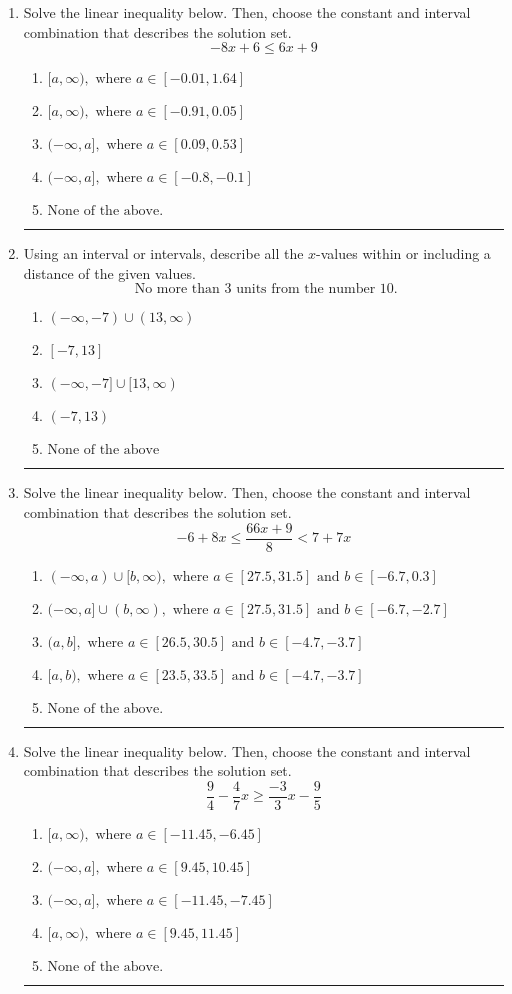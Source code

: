 \documentclass[14pt]{extbook}
\newcommand{\litem}[1]{\item#1\hspace*{-1cm}\rule{\textwidth}{0.4pt}}
\begin{document}
\begin{enumerate}
\litem{
Solve the linear inequality below. Then, choose the constant and interval combination that describes the solution set.\[ -8x + 6 \leq 6x + 9 \]\begin{enumerate}[label=\Alph*.]
\item \( [a, \infty), \text{ where } a \in [-0.01, 1.64] \)
\item \( [a, \infty), \text{ where } a \in [-0.91, 0.05] \)
\item \( (-\infty, a], \text{ where } a \in [0.09, 0.53] \)
\item \( (-\infty, a], \text{ where } a \in [-0.8, -0.1] \)
\item \( \text{None of the above}. \)

\end{enumerate} }
\litem{
Using an interval or intervals, describe all the $x$-values within or including a distance of the given values.\[ \text{ No more than } 3 \text{ units from the number } 10. \]\begin{enumerate}[label=\Alph*.]
\item \( (-\infty, -7) \cup (13, \infty) \)
\item \( [-7, 13] \)
\item \( (-\infty, -7] \cup [13, \infty) \)
\item \( (-7, 13) \)
\item \( \text{None of the above} \)

\end{enumerate} }
\litem{
Solve the linear inequality below. Then, choose the constant and interval combination that describes the solution set.\[ -6 + 8 x \leq \frac{66 x + 9}{8} < 7 + 7 x \]\begin{enumerate}[label=\Alph*.]
\item \( (-\infty, a) \cup [b, \infty), \text{ where } a \in [27.5, 31.5] \text{ and } b \in [-6.7, 0.3] \)
\item \( (-\infty, a] \cup (b, \infty), \text{ where } a \in [27.5, 31.5] \text{ and } b \in [-6.7, -2.7] \)
\item \( (a, b], \text{ where } a \in [26.5, 30.5] \text{ and } b \in [-4.7, -3.7] \)
\item \( [a, b), \text{ where } a \in [23.5, 33.5] \text{ and } b \in [-4.7, -3.7] \)
\item \( \text{None of the above.} \)

\end{enumerate} }
\litem{
Solve the linear inequality below. Then, choose the constant and interval combination that describes the solution set.\[ \frac{9}{4} - \frac{4}{7} x \geq \frac{-3}{3} x - \frac{9}{5} \]\begin{enumerate}[label=\Alph*.]
\item \( [a, \infty), \text{ where } a \in [-11.45, -6.45] \)
\item \( (-\infty, a], \text{ where } a \in [9.45, 10.45] \)
\item \( (-\infty, a], \text{ where } a \in [-11.45, -7.45] \)
\item \( [a, \infty), \text{ where } a \in [9.45, 11.45] \)
\item \( \text{None of the above}. \)


\end{enumerate}}
\end{enumerate}
\end{document}
